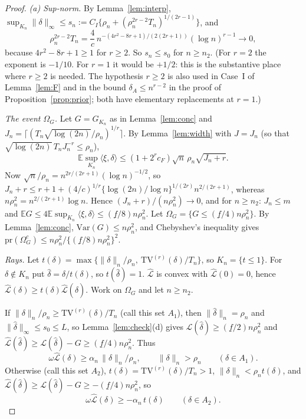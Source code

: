 \documentclass[11pt]{article}
\theoremstyle{definition}
\theoremstyle{remark}
\newcommand{\E}{\mathbb{E}}
\newcommand{\pr}{\mathrm{pr}}
\newcommand{\TV}{\mathrm{TV}}
\newcommand{\om}{\omega}
\newcommand{\Lh}{\widehat{\mathcal L}}
\newcommand{\Lm}{\mathcal L}
\newcommand{\fl}{\underline f}
\newcommand{\nn}[1]{\|#1\|_n}
\begin{document}
\begin{proof}
\emph{(a) Sup-norm.} By Lemma~\ref{lem:interp}, $\sup_{K_n}\|\delta\|_\infty\le s_n:=C_I\{\rho_n+(\rho_n^{2r-2}T_n)^{1/(2r-1)}\}$, and
\[
\rho_n^{2r-2}T_n=\frac4c\,n^{-(4r^2-8r+1)/(2(2r+1))}(\log n)^{r-1}\longrightarrow0,
\]
because $4r^2-8r+1\ge1$ for $r\ge2$. So $s_n\le s_0$ for $n\ge n_2$. (For $r=2$ the exponent is $-1/10$. For $r=1$ it would be $+1/2$: this is the substantive place where $r\ge2$ is needed. The hypothesis $r\ge2$ is also used in Case~I of Lemma~\ref{lem:F} and in the bound $\delta_A\le n^{r-2}$ in the proof of Proposition~\ref{prop:prior}; both have elementary replacements at $r=1$.)

\emph{The event $\Omega_G$.} Let $G=G_{K_n}$ as in Lemma~\ref{lem:conc} and $J_n=\lceil(T_n\sqrt{\log(2n)}/\rho_n)^{1/r}\rceil$. By Lemma~\ref{lem:width} with $J=J_n$ (so that $\sqrt{\log(2n)}\,T_nJ_n^{-r}\le\rho_n$),
\[
\E\sup_{K_n}\langle\xi,\delta\rangle\le(1+2^rc_F)\sqrt n\,\rho_n\sqrt{J_n+r}.
\]
Now $\sqrt n/\rho_n=n^{2r/(2r+1)}(\log n)^{-1/2}$, so $J_n+r\le r+1+(4/c)^{1/r}\{\log(2n)/\log n\}^{1/(2r)}n^{2/(2r+1)}$, whereas $n\rho_n^2=n^{2/(2r+1)}\log n$. Hence $(J_n+r)/(n\rho_n^2)\to0$, and for $n\ge n_2$: $J_n\le m$ and $\E G\le4\E\sup_{K_n}\langle\xi,\delta\rangle\le(\fl/8)n\rho_n^2$. Let $\Omega_G=\{G\le(\fl/4)n\rho_n^2\}$. By Lemma~\ref{lem:conc}, $\mathrm{Var}(G)\le n\rho_n^2$, and Chebyshev's inequality gives $\pr(\Omega_G^c)\le n\rho_n^2/\{(\fl/8)n\rho_n^2\}^2$.

\emph{Rays.} Let $t(\delta)=\max\{\nn{\delta}/\rho_n,\ \TV^{(r)}(\delta)/T_n\}$, so $K_n=\{t\le1\}$. For $\delta\notin K_n$ put $\hat\delta=\delta/t(\delta)$, so $t(\hat\delta)=1$. $\Lh$ is convex with $\Lh(0)=0$, hence $\Lh(\delta)\ge t(\delta)\Lh(\hat\delta)$. Work on $\Omega_G$ and let $n\ge n_2$.

If $\nn{\delta}/\rho_n\ge\TV^{(r)}(\delta)/T_n$ (call this set $A_1$), then $\nn{\hat\delta}=\rho_n$ and $\|\hat\delta\|_\infty\le s_0\le L$, so Lemma~\ref{lem:check}(d) gives $\Lm(\hat\delta)\ge(\fl/2)n\rho_n^2$ and $\Lh(\hat\delta)\ge\Lm(\hat\delta)-G\ge(\fl/4)n\rho_n^2$. Thus
\begin{equation}\label{eq:A1}
\om\Lh(\delta)\ge\alpha_n\,\nn{\delta}/\rho_n,\qquad \nn{\delta}>\rho_n\qquad(\delta\in A_1).
\end{equation}
Otherwise (call this set $A_2$), $t(\delta)=\TV^{(r)}(\delta)/T_n>1$, $\nn{\delta}<\rho_nt(\delta)$, and $\Lh(\hat\delta)\ge\Lm(\hat\delta)-G\ge-(\fl/4)n\rho_n^2$, so
\begin{equation}\label{eq:A2}
\om\Lh(\delta)\ge-\alpha_n\,t(\delta)\qquad(\delta\in A_2).
\end{equation}


\end{proof}
\end{document}
